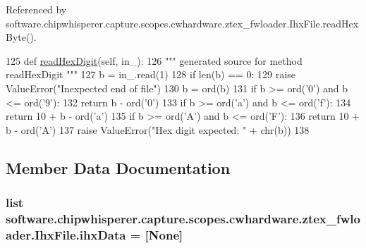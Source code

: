 Referenced by software.\+chipwhisperer.\+capture.\+scopes.\+cwhardware.\+ztex\+\_\+fwloader.\+Ihx\+File.\+read\+Hex\+Byte().


\begin{DoxyCode}
125     \textcolor{keyword}{def }\hyperlink{classsoftware_1_1chipwhisperer_1_1capture_1_1scopes_1_1cwhardware_1_1ztex__fwloader_1_1IhxFile_a8b61d10ee00906b77f34dc68ca470aca}{readHexDigit}(self, in\_):
126         \textcolor{stringliteral}{""" generated source for method readHexDigit """}
127         b = in\_.read(1)
128         \textcolor{keywordflow}{if} len(b) == 0:
129             \textcolor{keywordflow}{raise} ValueError(\textcolor{stringliteral}{"Inexpected end of file"})
130         b = ord(b)
131         \textcolor{keywordflow}{if} b >= ord(\textcolor{stringliteral}{'0'}) \textcolor{keywordflow}{and} b <= ord(\textcolor{stringliteral}{'9'}):
132             \textcolor{keywordflow}{return} b - ord(\textcolor{stringliteral}{'0'})
133         \textcolor{keywordflow}{if} b >= ord(\textcolor{stringliteral}{'a'}) \textcolor{keywordflow}{and} b <= ord(\textcolor{stringliteral}{'f'}):
134             \textcolor{keywordflow}{return} 10 + b - ord(\textcolor{stringliteral}{'a'})
135         \textcolor{keywordflow}{if} b >= ord(\textcolor{stringliteral}{'A'}) \textcolor{keywordflow}{and} b <= ord(\textcolor{stringliteral}{'F'}):
136             \textcolor{keywordflow}{return} 10 + b - ord(\textcolor{stringliteral}{'A'})
137         \textcolor{keywordflow}{raise} ValueError(\textcolor{stringliteral}{"Hex digit expected: "} + chr(b))
138 
\end{DoxyCode}


\subsection{Member Data Documentation}
\hypertarget{classsoftware_1_1chipwhisperer_1_1capture_1_1scopes_1_1cwhardware_1_1ztex__fwloader_1_1IhxFile_ac73784252a5933c87af8f0091296db16}{}
\subsubsection[{ihx\+Data}]{\setlength{\rightskip}{0pt plus 5cm}list software.\+chipwhisperer.\+capture.\+scopes.\+cwhardware.\+ztex\+\_\+fwloader.\+Ihx\+File.\+ihx\+Data = \mbox{[}None\mbox{]}\hspace{0.3cm}{\ttfamily [static]}}\label{classsoftware_1_1chipwhisperer_1_1capture_1_1scopes_1_1cwhardware_1_1ztex__fwloader_1_1IhxFile_ac73784252a5933c87af8f0091296db16}


